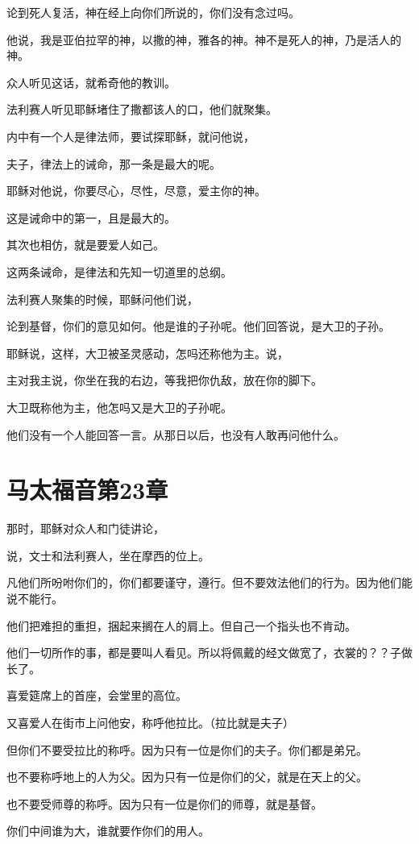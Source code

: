 \documentclass[12pt,oneside]{book}
\begin{document}
论到死人复活，神在经上向你们所说的，你们没有念过吗。

他说，我是亚伯拉罕的神，以撒的神，雅各的神。神不是死人的神，乃是活人的神。

众人听见这话，就希奇他的教训。

法利赛人听见耶稣堵住了撒都该人的口，他们就聚集。

内中有一个人是律法师，要试探耶稣，就问他说，

夫子，律法上的诫命，那一条是最大的呢。

耶稣对他说，你要尽心，尽性，尽意，爱主你的神。

这是诫命中的第一，且是最大的。

其次也相仿，就是要爱人如己。

这两条诫命，是律法和先知一切道里的总纲。

法利赛人聚集的时候，耶稣问他们说，

论到基督，你们的意见如何。他是谁的子孙呢。他们回答说，是大卫的子孙。

耶稣说，这样，大卫被圣灵感动，怎吗还称他为主。说，

主对我主说，你坐在我的右边，等我把你仇敌，放在你的脚下。

大卫既称他为主，他怎吗又是大卫的子孙呢。

他们没有一个人能回答一言。从那日以后，也没有人敢再问他什么。

\chapter{马太福音第23章}
那时，耶稣对众人和门徒讲论，

说，文士和法利赛人，坐在摩西的位上。

凡他们所吩咐你们的，你们都要谨守，遵行。但不要效法他们的行为。因为他们能说不能行。

他们把难担的重担，捆起来搁在人的肩上。但自己一个指头也不肯动。

他们一切所作的事，都是要叫人看见。所以将佩戴的经文做宽了，衣裳的？？子做长了。

喜爱筵席上的首座，会堂里的高位。

又喜爱人在街市上问他安，称呼他拉比。（拉比就是夫子）

但你们不要受拉比的称呼。因为只有一位是你们的夫子。你们都是弟兄。

也不要称呼地上的人为父。因为只有一位是你们的父，就是在天上的父。

也不要受师尊的称呼。因为只有一位是你们的师尊，就是基督。

你们中间谁为大，谁就要作你们的用人。
\end{document}
